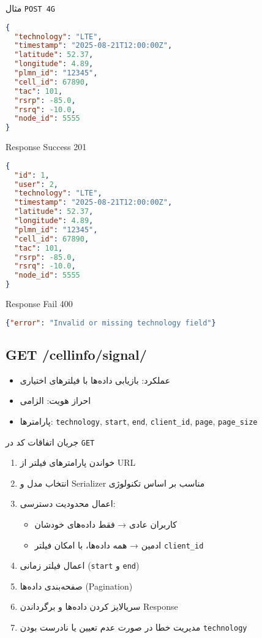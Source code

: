 \documentclass{report}
\begin{document}
مثال \texttt{POST 4G}
\begin{lstlisting}[language=json]
{
  "technology": "LTE",
  "timestamp": "2025-08-21T12:00:00Z",
  "latitude": 52.37,
  "longitude": 4.89,
  "plmn_id": "12345",
  "cell_id": 67890,
  "tac": 101,
  "rsrp": -85.0,
  "rsrq": -10.0,
  "node_id": 5555
}
\end{lstlisting}

Response Success 201
\begin{lstlisting}[language=json]
{
  "id": 1,
  "user": 2,
  "technology": "LTE",
  "timestamp": "2025-08-21T12:00:00Z",
  "latitude": 52.37,
  "longitude": 4.89,
  "plmn_id": "12345",
  "cell_id": 67890,
  "tac": 101,
  "rsrp": -85.0,
  "rsrq": -10.0,
  "node_id": 5555
}
\end{lstlisting}

Response Fail 400
\begin{lstlisting}[language=json]
{"error": "Invalid or missing technology field"}
\end{lstlisting}

\subsection{GET /cellinfo/signal/}
\begin{itemize}
    \item عملکرد: بازیابی داده‌ها با فیلترهای اختیاری
    \item احراز هویت: الزامی
    \item پارامترها: \texttt{technology}, \texttt{start}, \texttt{end}, \texttt{client\_id}, \texttt{page}, \texttt{page\_size}
\end{itemize}

جریان اتفاقات کد در \texttt{GET}
\begin{enumerate}
    \item خواندن پارامترهای فیلتر از URL
    \item انتخاب مدل و Serializer مناسب بر اساس تکنولوژی
    \item اعمال محدودیت دسترسی:
    \begin{itemize}
        \item کاربران عادی → فقط داده‌های خودشان
        \item ادمین → همه داده‌ها، با امکان فیلتر \texttt{client\_id}
    \end{itemize}
    \item اعمال فیلتر زمانی (\texttt{start} و \texttt{end})
    \item صفحه‌بندی داده‌ها (Pagination)
    \item سریالایز کردن داده‌ها و برگرداندن Response
    \item مدیریت خطا در صورت عدم تعیین یا نادرست بودن \texttt{technology}
\end{enumerate}
\end{document}
